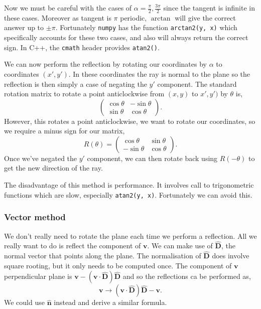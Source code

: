 \documentclass{article}
\let\vec \bm
\begin{document}
Now we must be careful with the cases of $\alpha = \frac{\pi}{2}, \frac{3\pi}{2}$ since the tangent is infinite in these cases. Moreover as tangent is $\pi$ periodic, $\arctan$ will give the correct answer up to $\pm \pi$. Fortunately \texttt{numpy} has the function \texttt{arctan2(y, x)} which specifically accounts for these two cases, and also will always return the correct sign. In C++, the \texttt{cmath} header provides \texttt{atan2()}.

We can now perform the reflection by rotating our coordinates by $\alpha$ to coordinates $(x', y')$. In these coordinates the ray is normal to the plane so the reflection is then simply a case of negating the $y'$ component. The standard rotation matrix to rotate a point anticlockwise from $(x, y)$ to $x', y')$ by $\theta$ is,
\begin{equation}
    \begin{pmatrix}
        \cos \theta & -\sin \theta \\
        \sin \theta &  \cos \theta
    \end{pmatrix}.
\end{equation}
However, this rotates a point anticlockwise, we want to rotate our coordinates, so we require a minus sign for our matrix,
\begin{equation}
    \label{eq:rotation_matrix}
    R(\theta)
    =
    \begin{pmatrix}
         \cos \theta & \sin \theta \\
        -\sin \theta & \cos \theta
    \end{pmatrix}.
\end{equation}
Once we've negated the $y'$ component, we can then rotate back using $R(-\theta)$ to get the new direction of the ray.

The disadvantage of this method is performance. It involves call to trigonometric functions which are slow, especially \texttt{atan2(y, x)}. Fortunately we can avoid this.

\subsubsection{Vector method}
We don't really need to rotate the plane each time we perform a reflection. All we really want to do is reflect the component of $\vec{v}$. We can make use of $\vec{\hat{D}}$, the normal vector that points along the plane. The normalisation of $\vec{\hat{D}}$ does involve square rooting, but it only needs to be computed once. The component of $\vec{v}$ perpendicular plane is $\vec{v} - (\vec{v} \cdot \vec{\hat{D}}) \vec{\hat{D}}$ and so the reflections ca be performed as,
\begin{equation}
    \vec{v}
    \rightarrow
    (\vec{v} \cdot \vec{\hat{D}}) \vec{\hat{D}} - \vec{v}.
\end{equation}
We could use $\vec{\hat{n}}$ instead and derive a similar formula.
\end{document}
